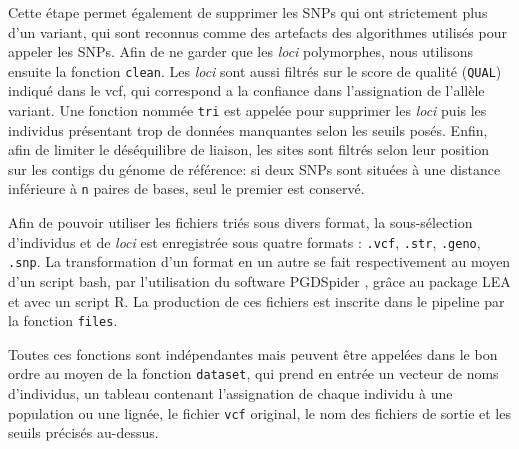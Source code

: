 Cette étape permet également de supprimer les SNPs qui ont strictement plus d'un variant, qui sont reconnus comme des artefacts des algorithmes utilisés pour appeler les SNPs.
Afin de ne garder que les \textit{loci} polymorphes, nous utilisons ensuite la fonction \verb|clean|. Les \textit{loci} sont aussi filtrés sur le score de qualité (\verb|QUAL|) indiqué dans le vcf, qui correspond a la confiance dans l'assignation de l'allèle variant.
 Une fonction nommée \verb|tri| est appelée pour supprimer les \textit{loci} puis les individus présentant trop de données manquantes selon les seuils posés. Enfin, afin de limiter le déséquilibre de liaison, les sites sont filtrés selon leur position sur les contigs du génome de référence: si deux SNPs sont situées à une distance inférieure à \verb|n| paires de bases, seul le premier est conservé.

Afin de pouvoir utiliser les fichiers triés sous divers format, la sous-sélection d'individus et de \textit{loci} est enregistrée sous quatre formats : \verb|.vcf|, \verb|.str|, \verb|.geno|, \verb|.snp|.
 La transformation d'un format en un autre se fait respectivement au moyen d'un script bash, par l'utilisation du software PGDSpider \citep{Lischer2012}, grâce au package LEA \citep{Frichot2015} et avec un script R.
 La production de ces fichiers est inscrite dans le pipeline par la fonction \verb|files|.

Toutes ces fonctions sont indépendantes mais peuvent être appelées dans le bon ordre au moyen de la fonction \verb|dataset|, qui prend en entrée un vecteur de noms d'individus, un tableau contenant l'assignation de chaque individu à une population ou une lignée, le fichier \verb|vcf| original, le nom des fichiers de sortie et les seuils précisés au-dessus.

